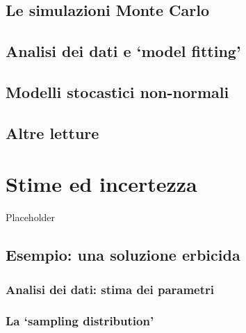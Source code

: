 \documentclass[a4paper,12pt,oneside]{book}
\begin{document}
\hypertarget{le-simulazioni-monte-carlo}{%
\section{Le simulazioni Monte Carlo}\label{le-simulazioni-monte-carlo}}

\hypertarget{analisi-dei-dati-e-model-fitting}{%
\section{Analisi dei dati e `model fitting'}\label{analisi-dei-dati-e-model-fitting}}

\hypertarget{modelli-stocastici-non-normali}{%
\section{Modelli stocastici non-normali}\label{modelli-stocastici-non-normali}}

\hypertarget{altre-letture-3}{%
\section{Altre letture}\label{altre-letture-3}}

\hypertarget{stime-ed-incertezza}{%
\chapter{Stime ed incertezza}\label{stime-ed-incertezza}}

Placeholder

\hypertarget{esempio-una-soluzione-erbicida}{%
\section{Esempio: una soluzione erbicida}\label{esempio-una-soluzione-erbicida}}

\hypertarget{analisi-dei-dati-stima-dei-parametri}{%
\subsection{Analisi dei dati: stima dei parametri}\label{analisi-dei-dati-stima-dei-parametri}}

\hypertarget{la-sampling-distribution}{%
\subsection{La `sampling distribution'}\label{la-sampling-distribution}}
\end{document}
